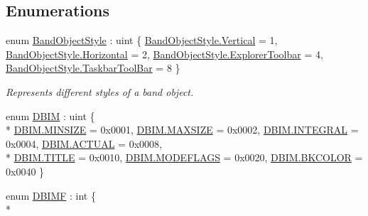 \subsection*{Enumerations}
\begin{DoxyCompactItemize}
\item 
enum \hyperlink{namespace_band_objects_lib_a27f3f2f266615c311d6a3ac052c2462c}{Band\+Object\+Style} \+: uint \{ \hyperlink{namespace_band_objects_lib_a27f3f2f266615c311d6a3ac052c2462ca06ce2a25e5d12c166a36f654dbea6012}{Band\+Object\+Style.\+Vertical} = 1, 
\hyperlink{namespace_band_objects_lib_a27f3f2f266615c311d6a3ac052c2462cac1b5fa03ecdb95d4a45dd1c40b02527f}{Band\+Object\+Style.\+Horizontal} = 2, 
\hyperlink{namespace_band_objects_lib_a27f3f2f266615c311d6a3ac052c2462ca6951e77ca95592fbf49fd9ada48203d2}{Band\+Object\+Style.\+Explorer\+Toolbar} = 4, 
\hyperlink{namespace_band_objects_lib_a27f3f2f266615c311d6a3ac052c2462ca51490cfc82ab8ecb613284aeb75d4e8c}{Band\+Object\+Style.\+Taskbar\+Tool\+Bar} = 8
 \}
\begin{DoxyCompactList}\small\item\em Represents different styles of a band object. \end{DoxyCompactList}\item 
enum \hyperlink{namespace_band_objects_lib_a50a5414ef82d3f30087a91038378683d}{D\+B\+I\+M} \+: uint \{ \\*
\hyperlink{namespace_band_objects_lib_a50a5414ef82d3f30087a91038378683dac5e099554555a9dab0a434effe61372b}{D\+B\+I\+M.\+M\+I\+N\+S\+I\+Z\+E} = 0x0001, 
\hyperlink{namespace_band_objects_lib_a50a5414ef82d3f30087a91038378683daaa312581a268989654f7f5c7b023c964}{D\+B\+I\+M.\+M\+A\+X\+S\+I\+Z\+E} = 0x0002, 
\hyperlink{namespace_band_objects_lib_a50a5414ef82d3f30087a91038378683daf36486258ab7a6bde60e99c2b88553d5}{D\+B\+I\+M.\+I\+N\+T\+E\+G\+R\+A\+L} = 0x0004, 
\hyperlink{namespace_band_objects_lib_a50a5414ef82d3f30087a91038378683da93234b302785a1fd5b0c196dac33d695}{D\+B\+I\+M.\+A\+C\+T\+U\+A\+L} = 0x0008, 
\\*
\hyperlink{namespace_band_objects_lib_a50a5414ef82d3f30087a91038378683da6f9dccd85b2e0786c8d522045365eb48}{D\+B\+I\+M.\+T\+I\+T\+L\+E} = 0x0010, 
\hyperlink{namespace_band_objects_lib_a50a5414ef82d3f30087a91038378683dada9738da822f67447434d681406b05ec}{D\+B\+I\+M.\+M\+O\+D\+E\+F\+L\+A\+G\+S} = 0x0020, 
\hyperlink{namespace_band_objects_lib_a50a5414ef82d3f30087a91038378683daa3fbb4ce45005386c4e9a7495555268a}{D\+B\+I\+M.\+B\+K\+C\+O\+L\+O\+R} = 0x0040
 \}
\item 
enum \hyperlink{namespace_band_objects_lib_a404a4f848406d76dddf221189cea32ca}{D\+B\+I\+M\+F} \+: int \{ \\*

\end{DoxyCompactItemize}
